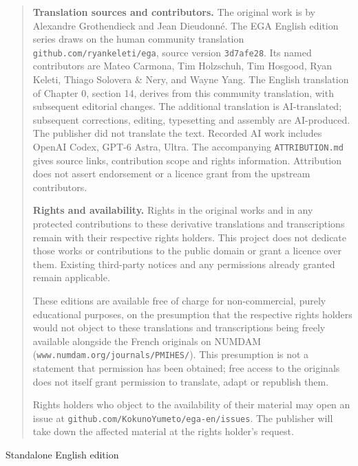 \begingroup
\small
\begin{quote}
\textbf{Translation sources and contributors.}
The original work is by Alexandre Grothendieck and Jean Dieudonn\'e.
The EGA English edition series draws on the human community translation
\texttt{github.com/ryankeleti/ega}, source version \texttt{3d7afe28}.
Its named contributors are Mateo Carmona, Tim Holzschuh, Tim Hosgood,
Ryan Keleti, Thiago Solovera \& Nery, and Wayne Yang.
The English translation of Chapter 0, section 14, derives from this community translation, with subsequent editorial changes.
The additional translation is AI-translated; subsequent corrections, editing,
typesetting and assembly are AI-produced. The publisher did not translate
the text. Recorded AI work includes OpenAI Codex,
GPT-6 Astra, Ultra.
The accompanying \texttt{ATTRIBUTION.md} gives source links, contribution
scope and rights information. Attribution does not assert endorsement
or a licence grant from the upstream contributors.

\medskip
\textbf{Rights and availability.}
Rights in the original works and in any protected contributions to these
derivative translations and transcriptions remain with their respective
rights holders. This project does not dedicate those works or contributions
to the public domain or grant a licence over them. Existing third-party
notices and any permissions already granted remain applicable.

These editions are available free of charge for non-commercial, purely
educational purposes, on the presumption that the respective rights holders
would not object to these translations and transcriptions being freely
available alongside the French originals on NUMDAM
(\texttt{www.numdam.org/journals/PMIHES/}). This presumption is not a statement
that permission has been obtained; free access to the originals does not
itself grant permission to translate, adapt or republish them.

Rights holders who object to the availability of their material may open
an issue at \texttt{github.com/KokunoYumeto/ega-en/issues}. The publisher
will take down the affected material at the rights holder's request.
\end{quote}
\endgroup


\begin{center}
\large Standalone English edition
\end{center}

\tableofcontents


